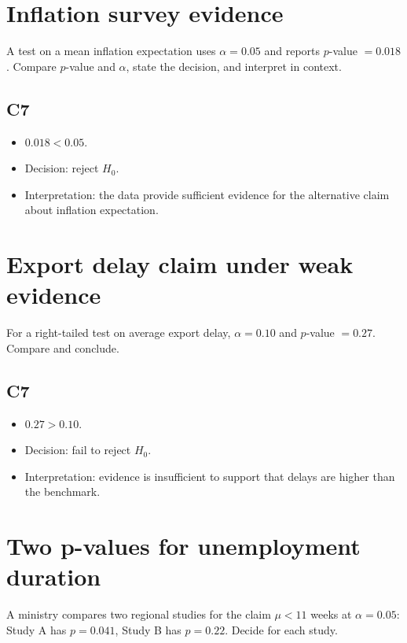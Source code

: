 \begin{ExamProblems}

\item
\section{Inflation survey evidence}
A test on a mean inflation expectation uses \(\alpha=0.05\) and reports \(p\)-value \(=0.018\). Compare \(p\)-value and \(\alpha\), state the decision, and interpret in context.

\subsection*{C7}
\begin{itemize}
    \item \(0.018<0.05\).
    \item Decision: reject \(H_0\).
    \item Interpretation: the data provide sufficient evidence for the alternative claim about inflation expectation.
\end{itemize}

\item
\section{Export delay claim under weak evidence}
For a right-tailed test on average export delay, \(\alpha=0.10\) and \(p\)-value \(=0.27\). Compare and conclude.

\subsection*{C7}
\begin{itemize}
    \item \(0.27>0.10\).
    \item Decision: fail to reject \(H_0\).
    \item Interpretation: evidence is insufficient to support that delays are higher than the benchmark.
\end{itemize}

\item
\section{Two p-values for unemployment duration}
A ministry compares two regional studies for the claim \(\mu<11\) weeks at \(\alpha=0.05\): Study A has \(p=0.041\), Study B has \(p=0.22\). Decide for each study.


\end{ExamProblems}
